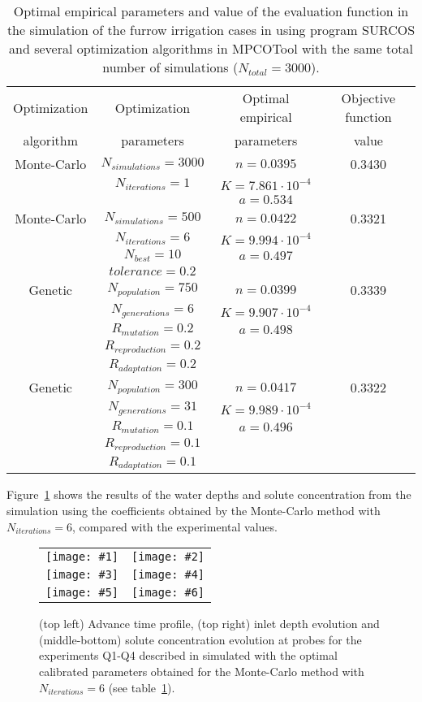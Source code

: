 \documentclass[review,authoryear]{elsarticle}
\newcommand{\TABLE}[5]
{
	\begin{table}[ht!]
		\centering
		\caption{#4.\label{#5}}
		#1
		\begin{tabular}{#2}
			#3
		\end{tabular}
	\end{table}
}
\newcommand{\FIGVI}[8]
{
	\begin{figure}[ht!]
		\centering
		\begin{tabular}{cc}
			\texttt{[image: \#1]} & \texttt{[image: \#2]} \\
			\texttt{[image: \#3]} & \texttt{[image: \#4]} \\
			\texttt{[image: \#5]} & \texttt{[image: \#6]}
		\end{tabular}
		\caption{#7.\label{#8}}
	\end{figure}
}
\begin{document}
\TABLE{\scriptsize}{cccc}
{
	Optimization & Optimization & Optimal empirical & Objective function
	\\ algorithm & parameters & parameters & value
	\\ \hline
	Monte-Carlo & $N_{simulations}=3000$ & $n=0.0395$ & 0.3430
	\\ & $N_{iterations}=1$ & $K=7.861\cdot 10^{-4}$
	\\ & & $a=0.534$
	\\ \hline
	Monte-Carlo & $N_{simulations}=500$ & $n=0.0422$ & 0.3321
	\\ & $N_{iterations}=6$ & $K=9.994\cdot 10^{-4}$
	\\ & $N_{best}=10$ & $a=0.497$
	\\ & $tolerance=0.2$
	\\ \hline
	Genetic & $N_{population}=750$ & $n=0.0399$ & 0.3339
	\\ & $N_{generations}=6$ & $K=9.907\cdot 10^{-4}$
	\\ & $R_{mutation}=0.2$ & $a=0.498$
	\\ & $R_{reproduction}=0.2$
	\\ & $R_{adaptation}=0.2$
	\\ \hline
	Genetic & $N_{population}=300$ & $n=0.0417$ & 0.3322
	\\ & $N_{generations}=31$ & $K=9.989\cdot 10^{-4}$
	\\ & $R_{mutation}=0.1$ & $a=0.496$
	\\ & $R_{reproduction}=0.1$
	\\ & $R_{adaptation}=0.1$
	\\ \hline
}{Optimal empirical parameters and value of the evaluation function in the simulation of the furrow irrigation cases in \citet{JaviSurcos2} using program SURCOS and several optimization algorithms in MPCOTool with the same total number of simulations ($N_{total}=3000$)}{TabSurcos}

Figure~\ref{FigSurcos} shows the results of the water depths and solute concentration from the simulation using the coefficients obtained by the Monte-Carlo method with $N_{iterations}=6$, compared with the experimental values.

\FIGVI{surcos-advance.eps}{surcos-depth.eps}{surcos-solute-q1.eps}
{surcos-solute-q2.eps}{surcos-solute-q3.eps}{surcos-solute-q4.eps}
{(top left) Advance time profile, (top right) inlet depth evolution and
(middle-bottom) solute concentration evolution at probes for the experiments
Q1-Q4 described in \citet{JaviSurcos2} simulated with the optimal calibrated
parameters obtained for the Monte-Carlo method with $N_{iterations}=6$ (see
table~\ref{TabSurcos})}{FigSurcos}
\end{document}
